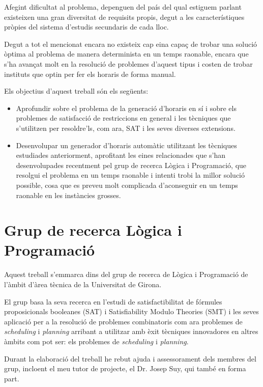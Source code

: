 \documentclass[11pt,a4paper,twoside]{report}
\begin{document}
  Afegint dificultat al problema, depenguen del país del qual estiguem parlant existeixen una gran diversitat de requisits propis, degut a les característiques pròpies del sistema d'estudis secundaris de cada lloc.

  Degut a tot el mencionat encara no existeix cap eina capaç de trobar una solució òptima al problema de manera determinista en un temps raonable, encara que s'ha avançat molt en la resolució de problemes d'aquest tipus i costen de trobar instituts que optin per fer els horaris de forma manual.
  
  Els objectius d'aquest treball són els següents:
  \begin{itemize}
    \item Aprofundir sobre el problema de la generació d'horaris en sí i sobre els problemes de satisfacció de restriccions en general i les tècniques que s'utilitzen per resoldre'ls, com ara, SAT i les seves diverses extensions.
    \item Desenvolupar un generador d'horaris automàtic utilitzant les tècniques estudiades anteriorment, aprofitant les eines relacionades que s'han desenvolupades recentment pel grup de recerca Lògica i Programació, que resolgui el problema en un temps raonable i intenti trobi la millor solució possible, 
    cosa que es preveu molt complicada d'aconseguir en un temps raonable en les instàncies grosses.
    
  \end{itemize}
  
  \section{Grup de recerca Lògica i Programació}
  Aquest treball s'emmarca dins del grup de recerca de Lògica i Programació de l'àmbit d'àrea tècnica de la Universitat de Girona.

  El grup basa la seva recerca en l'estudi de satisfactibilitat de fórmules proposicionals booleanes (SAT) i Satisfiability Modulo Theories (SMT) i les seves
  aplicació per a la resolució de problemes combinatoris com ara problemes de \textit{scheduling} i \textit{planning} arribant a utilitzar amb èxit tècniques innovadores en altres àmbits com
  pot ser: els problemes de \textit{scheduling} i \textit{planning}.

  Durant la elaboració del treball he rebut ajuda i assessorament dels membres del grup, incloent el meu tutor de projecte, el Dr. Josep Suy, qui també en forma part.
\end{document}
